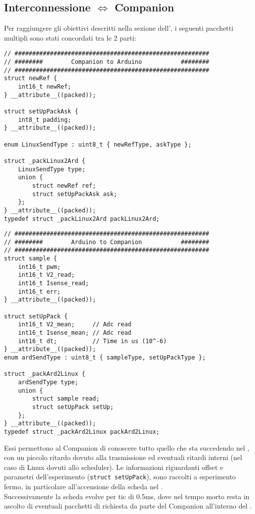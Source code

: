 \newpage
\subsection{Interconnessione \microControllore $\Leftrightarrow$ Companion}
Per raggiungere gli obiettivi descritti nella sezione dell', i seguenti pacchetti multipli sono stati concordati tra le 2 parti:
\begin{lstlisting}[style=cppStyle,caption={Pacchetti Companion $\Rightarrow$ \microControllore   },label=lst:Companion2ArdPack]
// #######################################################
// ########        Companion to Arduino           ########
// #######################################################
struct newRef {
	int16_t newRef;
} __attribute__((packed));

struct setUpPackAsk {
	int8_t padding;
} __attribute__((packed));

enum LinuxSendType : uint8_t { newRefType, askType };

struct _packLinux2Ard {
	LinuxSendType type;
	union {
		struct newRef ref;
		struct setUpPackAsk ask;
	};
} __attribute__((packed));
typedef struct _packLinux2Ard packLinux2Ard;
\end{lstlisting}

\begin{lstlisting}[style=cppStyle,caption={Pacchetti \microControllore $\Rightarrow$ Companion },label=lst:Ard2CompanionPack] 
// #######################################################
// ########        Arduino to Companion           ########
// #######################################################
struct sample {
	int16_t pwm;
	int16_t V2_read;
	int16_t Isense_read;
	int16_t err;
} __attribute__((packed));

struct setUpPack {
	int16_t V2_mean;     // Adc read
	int16_t Isense_mean; // Adc read
	int16_t dt;          // Time in us (10^-6)
} __attribute__((packed));
enum ardSendType : uint8_t { sampleType, setUpPackType };

struct _packArd2Linux {
	ardSendType type;
	union {
		struct sample read;
		struct setUpPack setUp;
	};
} __attribute__((packed));
typedef struct _packArd2Linux packArd2Linux;
\end{lstlisting}
\noindent
Essi permettono al Companion di conoscere tutto quello che sta succedendo nel \microC, con un piccolo ritardo dovuto alla trasmissione ed eventuali ritardi interni (nel caso di Linux dovuti allo scheduler).
Le informazioni riguardanti offset e parametri dell'esperimento (\verb|struct setUpPack|), sono raccolti a esperimento fermo, in particolare all'accensione della scheda nel .\\
Successivamente la scheda evolve per tic di 0.5ms, dove nel tempo morto resta in ascolto di eventuali pacchetti di richiesta da parte del Companion all'interno del .

